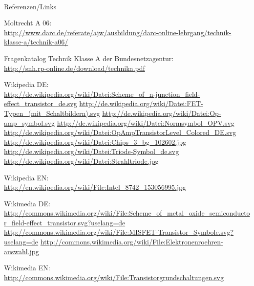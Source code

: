 \renewcommand{\refname}{Referenzen}

\hypertarget{refs}{}
\textcolor{white}{} \\ %
\Large Referenzen/Links
\footnotesize

\begin{thebibliography}{}
       Moltrecht A 06: \\
                    \url{http://www.darc.de/referate/ajw/ausbildung/darc-online-lehrgang/technik-klasse-a/technik-a06/}
                    
		Fragenkatalog Technik Klasse A der Bundesnetzagentur:\\
		\url{http://snh.rp-online.de/download/technika.pdf}                    
                    
        Wikipedia DE: \\
    	\url{http://de.wikipedia.org/wiki/Datei:Scheme_of_n-junction_field-effect_transistor_de.svg}
    	\url{http://de.wikipedia.org/wiki/Datei:FET-Typen_(mit_Schaltbildern).svg}
        \url{http://de.wikipedia.org/wiki/Datei:Op-amp_symbol.svg}
        \url{http://de.wikipedia.org/wiki/Datei:Normsymbol_OPV.svg}      
        \url{http://de.wikipedia.org/wiki/Datei:OpAmpTransistorLevel_Colored_DE.svg}  
        \url{http://de.wikipedia.org/wiki/Datei:Chips_3_bg_102602.jpg}
        \url{http://de.wikipedia.org/wiki/Datei:Triode-Symbol_de.svg}
        \url{http://de.wikipedia.org/wiki/Datei:Strahltriode.jpg}
                    
    	Wikipedia EN:\\
    	\url{http://en.wikipedia.org/wiki/File:Intel_8742_153056995.jpg}
    	
    	Wikimedia DE:\\
    	\url{http://commons.wikimedia.org/wiki/File:Scheme_of_metal_oxide_semiconductor_field-effect_transistor.svg?uselang=de}
    	\url{http://commons.wikimedia.org/wiki/File:MISFET-Transistor_Symbole.svg?uselang=de}
    	\url{http://commons.wikimedia.org/wiki/File:Elektronenroehren-auswahl.jpg}
    	
     Wikimedia EN:\\
    	\url{http://commons.wikimedia.org/wiki/File:Transistorgrundschaltungen.svg}\
    				
\end{thebibliography} 


